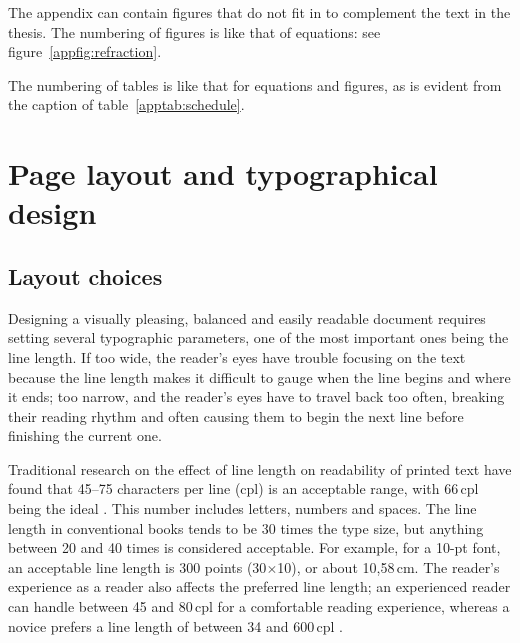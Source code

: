 \documentclass[english, 12pt, a4paper, elec, utf8, a-2b, online]{aaltothesis}
\begin{document}
The appendix can contain figures that do not fit in to complement the text in
the thesis. The numbering of figures is like that of equations: see figure~\ref{appfig:refraction}.

The numbering of tables is like that for equations and figures, as is evident
from the caption of table~\ref{apptab:schedule}.

\begin{table}[htb]
	\centering
	\caption{Caption for the table.}
	\label{apptab:schedule}
	\sffamily%
\end{table}


\clearpage
\section{Page layout and typographical design}
\label{app:layout}

\subsection*{Layout choices}

Designing a visually pleasing, balanced and easily readable document requires
setting several typographic parameters, one of the most important ones being the
line length. If too wide, the reader’s eyes have trouble focusing on the text
because the line length makes it difficult to gauge when the line begins and
where it ends; too narrow, and the reader’s eyes have to travel back too often,
breaking their reading rhythm and often causing them to begin the next line
before finishing the current one.

Traditional research on the effect of line length on readability of printed text
have found that 45--75 characters per line (cpl) is an acceptable range, with
66\,cpl being the ideal \cite{Bringhurst, Wikilinelength}. This number includes
letters, numbers and spaces. The line length in conventional books tends to be
30 times the type size, but anything between 20 and 40 times is considered
acceptable. For example, for a 10-pt font, an acceptable line length is 300
points (30$\times$10), or about 10,58\,cm. The reader’s experience as a reader
also affects the preferred line length; an experienced reader can handle between
45 and 80\,cpl for a comfortable reading experience, whereas a novice prefers a
line length of between 34 and 600\,cpl \cite{Unna}.
\end{document}
